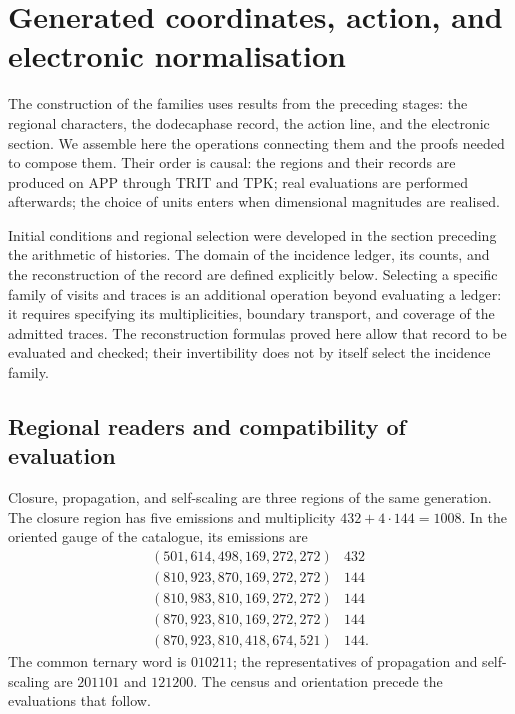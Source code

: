 \section{Generated coordinates, action, and electronic normalisation}
\label{vi:dep:seccion}\label{sec:k-registro}

The construction of the families uses results from the preceding stages:
the regional characters, the dodecaphase record, the action line, and the
electronic section. We assemble here the operations connecting them and the
proofs needed to compose them. Their order is causal: the regions and their
records are produced on APP through TRIT and TPK; real evaluations
are performed afterwards; the choice of units enters when dimensional
magnitudes are realised.

Initial conditions and regional selection were developed in
the section preceding the arithmetic of histories. The domain of the incidence
ledger, its counts, and the reconstruction of the record are defined
explicitly below. Selecting a specific family of
visits and traces is an additional operation beyond evaluating a ledger:
it requires specifying its multiplicities, boundary transport, and
coverage of the admitted traces. The reconstruction formulas
proved here allow that record to be evaluated and checked; their
invertibility does not by itself select the incidence family.

\subsection{Regional readers and compatibility of evaluation}
\label{vi:dep:regiones}

Closure, propagation, and self-scaling are three regions of the same
generation. The closure region has five emissions and multiplicity
\(432+4\cdot144=1008\). In the oriented gauge of the catalogue, its emissions
are
\[
\begin{array}{c|r}
(501,614,498,169,272,272)&432\\
(810,923,870,169,272,272)&144\\
(810,983,810,169,272,272)&144\\
(870,923,810,169,272,272)&144\\
(870,923,810,418,674,521)&144.
\end{array}
\]
The common ternary word is \(010211\); the representatives of propagation
and self-scaling are \(201101\) and \(121200\). The census and orientation
precede the evaluations that follow.

